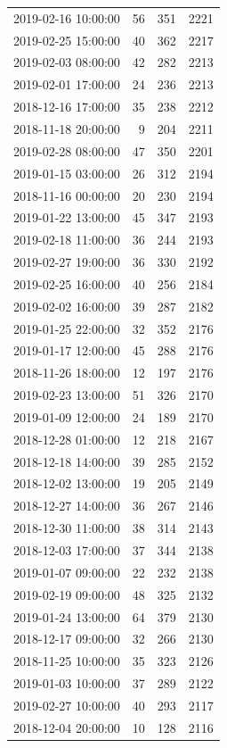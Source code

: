 \begin{tabular}{lrrr}
2019-02-16 10:00:00 & 56 & 351 & 2221 \\
2019-02-25 15:00:00 & 40 & 362 & 2217 \\
2019-02-03 08:00:00 & 42 & 282 & 2213 \\
2019-02-01 17:00:00 & 24 & 236 & 2213 \\
2018-12-16 17:00:00 & 35 & 238 & 2212 \\
2018-11-18 20:00:00 & 9 & 204 & 2211 \\
2019-02-28 08:00:00 & 47 & 350 & 2201 \\
2019-01-15 03:00:00 & 26 & 312 & 2194 \\
2018-11-16 00:00:00 & 20 & 230 & 2194 \\
2019-01-22 13:00:00 & 45 & 347 & 2193 \\
2019-02-18 11:00:00 & 36 & 244 & 2193 \\
2019-02-27 19:00:00 & 36 & 330 & 2192 \\
2019-02-25 16:00:00 & 40 & 256 & 2184 \\
2019-02-02 16:00:00 & 39 & 287 & 2182 \\
2019-01-25 22:00:00 & 32 & 352 & 2176 \\
2019-01-17 12:00:00 & 45 & 288 & 2176 \\
2018-11-26 18:00:00 & 12 & 197 & 2176 \\
2019-02-23 13:00:00 & 51 & 326 & 2170 \\
2019-01-09 12:00:00 & 24 & 189 & 2170 \\
2018-12-28 01:00:00 & 12 & 218 & 2167 \\
2018-12-18 14:00:00 & 39 & 285 & 2152 \\
2018-12-02 13:00:00 & 19 & 205 & 2149 \\
2018-12-27 14:00:00 & 36 & 267 & 2146 \\
2018-12-30 11:00:00 & 38 & 314 & 2143 \\
2018-12-03 17:00:00 & 37 & 344 & 2138 \\
2019-01-07 09:00:00 & 22 & 232 & 2138 \\
2019-02-19 09:00:00 & 48 & 325 & 2132 \\
2019-01-24 13:00:00 & 64 & 379 & 2130 \\
2018-12-17 09:00:00 & 32 & 266 & 2130 \\
2018-11-25 10:00:00 & 35 & 323 & 2126 \\
2019-01-03 10:00:00 & 37 & 289 & 2122 \\
2019-02-27 10:00:00 & 40 & 293 & 2117 \\
2018-12-04 20:00:00 & 10 & 128 & 2116 \\

\end{tabular}
